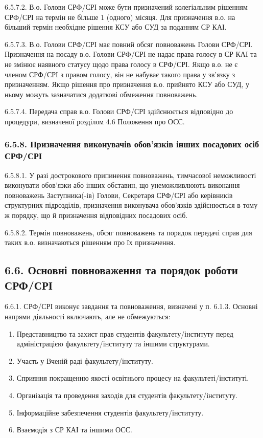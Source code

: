         6.5.7.2. В.о. Голови СРФ/СРІ може бути призначений колегіальним рішенням СРФ/СРІ на термін не більше 1 (одного) місяця. Для призначення в.о. на більший термін необхідне рішення КСУ або СУД за поданням СР КАІ.
        
        6.5.7.3. В.о. Голови СРФ/СРІ має повний обсяг повноважень Голови СРФ/СРІ. Призначення на посаду в.о. Голови СРФ/СРІ не надає права голосу в СР КАІ та не змінює наявного статусу щодо права голосу в СРФ/СРІ. Якщо в.о. не є членом СРФ/СРІ з правом голосу, він не набуває такого права у зв'язку з призначенням. Якщо рішення про призначення в.о. прийнято КСУ або СУД, у ньому можуть зазначатися додаткові обмеження повноважень.
        
        6.5.7.4. Передача справ в.о. Голови СРФ/СРІ здійснюється відповідно до процедури, визначеної розділом 4.6 Положення про ОСС.
        
    \subsubsection*{6.5.8. Призначення виконувачів обов'язків інших посадових осіб СРФ/СРІ}
        6.5.8.1. У разі дострокового припинення повноважень, тимчасової неможливості виконувати обов'язки або інших обставин, що унеможливлюють виконання повноважень Заступника(-ів) Голови, Секретаря СРФ/СРІ або керівників структурних підрозділів, призначення виконувача обов'язків здійснюється в тому ж порядку, що й призначення відповідних посадових осіб.
        
        6.5.8.2. Термін повноважень, обсяг повноважень та порядок передачі справ для таких в.о. визначаються рішенням про їх призначення.

\subsection*{6.6. Основні повноваження та порядок роботи СРФ/СРІ}
    6.6.1. СРФ/СРІ виконує завдання та повноваження, визначені у п. 6.1.3. Основні напрями діяльності включають, але не обмежуються:

        \begin{enumerate}[label=\alph*)]
            \item Представництво та захист прав студентів факультету/інституту перед адміністрацією факультету/інституту та іншими структурами.
            \item Участь у Вченій раді факультету/інституту.
            \item Сприяння покращенню якості освітнього процесу на факультеті/інституті.
            \item Організація та проведення заходів для студентів факультету/інституту.
            \item Інформаційне забезпечення студентів факультету/інституту.
            \item Взаємодія з СР КАІ та іншими ОСС.
        \end{enumerate}
        
